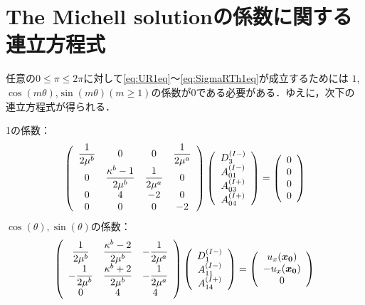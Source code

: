 \section{The Michell solutionの係数に関する連立方程式}

任意の$0\leq\pi\leq2\pi$に対して\eqref{eq:UR1eq}～\eqref{eq:SigmaRTh1eq}が成立するためには
$1$,$\cos(m\theta)$,$\sin(m\theta)$$(m\geq1)$の係数が0である必要がある．ゆえに，次下の連立方程式が得られる．

1の係数：
\begin{align}
	\left(
	\begin{array}{cccc}
		{\displaystyle\frac{1}{2\mu^b}}& 0 & 0 & {\displaystyle\frac{1}{2\mu^a}} \\
		0 & {\displaystyle\frac{\kappa^b-1}{2\mu^b}} & {\displaystyle\frac{1}{2\mu^a}} & 0 \\
		0 & 4 & -2 & 0 \\
		0 & 0 & 0 & -2 \\
	\end{array}
	\right)
	\left(
	\begin{array}{c}
		D_{3}^{(I-)} \\
	 	A_{01}^{(I-)} \\
		A_{03}^{(I+)}\\
	 	A_{04}^{(I+)} \\
	\end{array}
	\right)
	=
	\left(
	\begin{array}{c}
		0 \\
	 	0 \\
		0 \\
	 	0 \\
	\end{array}
	\right)
\end{align}
$\cos(\theta),\sin(\theta)$の係数：
\begin{align}
	\left(
	\begin{array}{ccc}
		{\displaystyle\frac{1}{2\mu^b}}& {\displaystyle\frac{\kappa^b-2}{2\mu^b}} & {\displaystyle-\frac{1}{2\mu^a}} \\
		{\displaystyle-\frac{1}{2\mu^b}} & {\displaystyle\frac{\kappa^b+2}{2\mu^b}} & {\displaystyle-\frac{1}{2\mu^a}} \\
		0 & 4 & 4 \\
	\end{array}
	\right)
	\left(
	\begin{array}{c}
		D_{1}^{(I-)} \\
	 	A_{11}^{(I-)} \\
	 	A_{14}^{(I+)} \\
	\end{array}
	\right)
	=
	\left(
	\begin{array}{c}
		u_{x}(\bm{x_{0}}) \\
	 	-u_{x}(\bm{x_{0}}) \\
	 	0 \\
	\end{array}
	\right)
\end{align}
